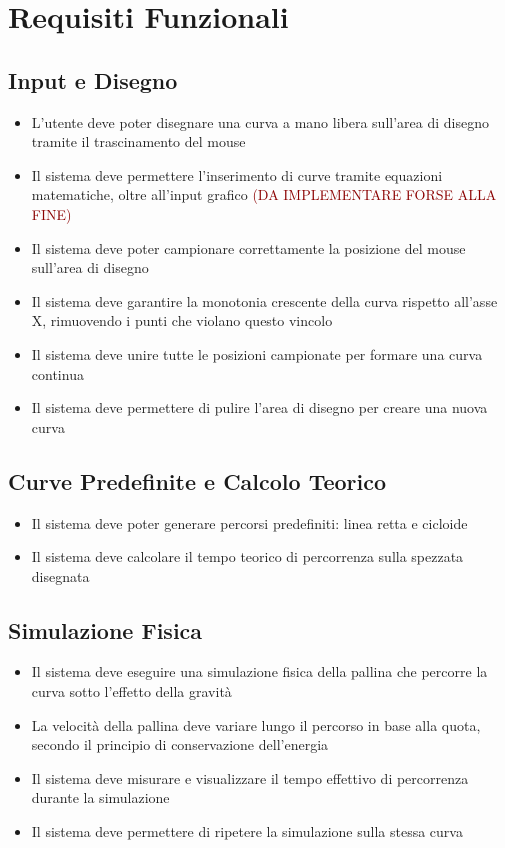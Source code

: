 \documentclass[a4paper,12pt]{article} %
\begin{document}
\section{Requisiti Funzionali}

\subsection{Input e Disegno}

\begin{itemize}
    \item L'utente deve poter disegnare una curva a mano libera sull'area di disegno tramite il trascinamento
          del mouse
    \item Il sistema deve permettere l'inserimento di curve tramite equazioni matematiche, oltre all'input
          grafico \textcolor{darkred}{(DA IMPLEMENTARE FORSE ALLA FINE)}
    \item Il sistema deve poter campionare correttamente la posizione del mouse sull'area di disegno
    \item Il sistema deve garantire la monotonia crescente della curva rispetto all'asse X, rimuovendo i
          punti che violano questo vincolo
    \item Il sistema deve unire tutte le posizioni campionate per formare una curva continua
    \item Il sistema deve permettere di pulire l'area di disegno per creare una nuova curva
\end{itemize}

\subsection{Curve Predefinite e Calcolo Teorico}

\begin{itemize}
    \item Il sistema deve poter generare percorsi predefiniti: linea retta e cicloide
    \item Il sistema deve calcolare il tempo teorico di percorrenza sulla spezzata disegnata
\end{itemize}

\subsection{Simulazione Fisica}

\begin{itemize}
    \item Il sistema deve eseguire una simulazione fisica della pallina che percorre la curva sotto
          l'effetto della gravità
    \item La velocità della pallina deve variare lungo il percorso in base alla quota, secondo il principio
          di conservazione dell'energia
    \item Il sistema deve misurare e visualizzare il tempo effettivo di percorrenza durante la simulazione
    \item Il sistema deve permettere di ripetere la simulazione sulla stessa curva
\end{itemize}
\end{document}

